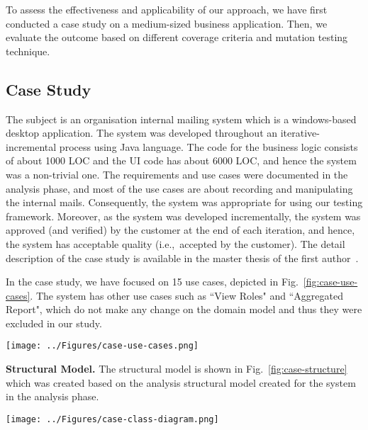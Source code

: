 %
%
\label{sec:evaluation}
To assess the effectiveness and applicability of our approach, we have first conducted a case study on a medium-sized business application. Then, we evaluate the outcome based on different coverage criteria and mutation testing technique. 


\subsection{Case Study}
\label{sec:evaluation-case-study}
The subject is an organisation internal mailing system which is a windows-based desktop application. The system was developed throughout an iterative-incremental process using Java language. The code for the business logic consists of about 1000 LOC and the UI code has about 6000 LOC, and hence the system was a non-trivial one.
The requirements and use cases were documented in the analysis phase, and most of the use cases are about recording and manipulating the internal mails. Consequently, the system was appropriate for using our testing framework. Moreover, as the system was developed incrementally, the system was approved (and verified) by the customer at the end of each iteration, and  hence, the system has acceptable quality (i.e.,\ accepted by the customer).
The detail description of the case study is available in the master thesis of the first author~\cite{Jalalinasab2012b}. 

In the case study, we have focused on 15 use cases, depicted in Fig.~\ref{fig:case-use-cases}. The system has other use cases such as ``View Roles" and ``Aggregated Report", which do not make any change on the domain model and thus they were excluded in our study. 

\begin{figure*}[h]
\centering
\texttt{[image: ../Figures/case-use-cases.png]}
\caption{Use case diagram for the case study.}
\label{fig:case-use-cases}
\end{figure*}

\textbf{Structural Model.} The structural model is shown in Fig.~\ref{fig:case-structure} which was created based on the analysis structural model created for the system in the analysis phase.

\begin{figure*}[!t]
\centering
\texttt{[image: ../Figures/case-class-diagram.png]}%
\caption{Structural model of the case study.}
\label{fig:case-structure}
\end{figure*} 

